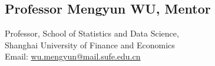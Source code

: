 \documentclass{resume}
\begin{document}
\vspace{6pt}
\noindent
\begin{minipage}[t]{0.48\textwidth}
\subsection{Professor Mengyun WU, {\small\color{gray}Mentor}}
Professor, School of Statistics and Data Science,\\
Shanghai University of Finance and Economics\\
Email: \url{wu.mengyun@mail.sufe.edu.cn}
\end{minipage}

\end{document}
